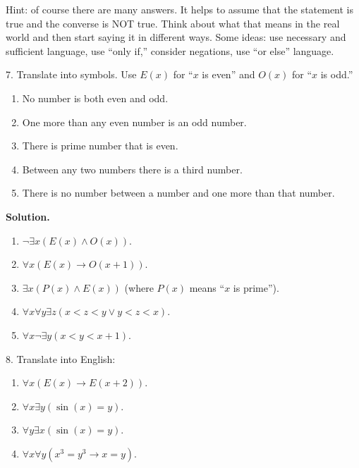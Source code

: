 \documentclass[10pt,]{book}
\theoremstyle{plain}
\theoremstyle{definition}
\theoremstyle{definition}
\theoremstyle{definition}
\def\imp{\rightarrow}
\newcommand{\lt}{ < }
\begin{document}
\begin{exerciselist}
          Hint: of course there are many answers. It helps to assume that the statement is true and the converse is NOT true. Think about what that means in the real world and then start saying it in different ways. Some ideas: use necessary and sufficient language, use ``only if,'' consider negations, use ``or else'' language.
\item[7.]\hypertarget{exercise-7}{}
          Translate into symbols. Use \(E(x)\) for ``\(x\) is even'' and \(O(x)\) for ``\(x\) is odd.''
\leavevmode%
\begin{enumerate}[label=(\alph*)]
\item\hypertarget{li-127}{} No number is both even and odd. %
\item\hypertarget{li-128}{} One more than any even number is an odd number. %
\item\hypertarget{li-129}{} There is prime number that is even. %
\item\hypertarget{li-130}{} Between any two numbers there is a third number. %
\item\hypertarget{li-131}{} There is no number between a number and one more than that number. %
\end{enumerate}
\par\smallskip
\par\smallskip
\noindent\textbf{Solution.}\hypertarget{solution-13}{}\quad
\leavevmode%
\begin{enumerate}[label=(\alph*)]
\item\hypertarget{li-132}{}\(\neg \exists x (E(x) \wedge O(x))\).\item\hypertarget{li-133}{}\(\forall x (E(x) \imp O(x+1))\).\item\hypertarget{li-134}{}\(\exists x(P(x) \wedge E(x))\) (where \(P(x)\) means ``\(x\) is prime'').\item\hypertarget{li-135}{}\(\forall x \forall y \exists z(x \lt  z \lt  y \vee y \lt  z \lt  x)\).\item\hypertarget{li-136}{}\(\forall x \neg \exists y (x \lt  y \lt  x+1)\).\end{enumerate}
\item[8.]\hypertarget{exercise-8}{}
          Translate into English:
\leavevmode%
\begin{enumerate}[label=(\alph*)]
\item\hypertarget{li-137}{}\(\forall x (E(x) \imp E(x +2))\).\item\hypertarget{li-138}{}\(\forall x \exists y (\sin(x) = y)\).\item\hypertarget{li-139}{}\(\forall y \exists x (\sin(x) = y)\).\item\hypertarget{li-140}{}\(\forall x \forall y (x^3 = y^3 \imp x = y)\).\end{enumerate}

\end{exerciselist}
\end{document}
